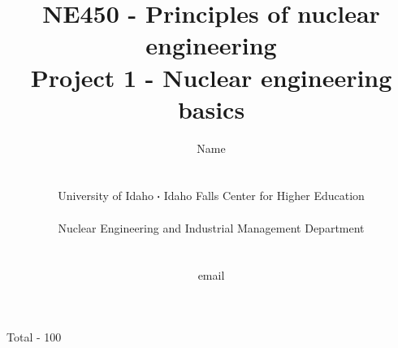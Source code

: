 \documentclass[11pt,a4paper]{article}
\newcommand*\sq{\mathbin{\vcenter{\hbox{\rule{.3ex}{.3ex}}}}} %
\begin{document}
\begin{titlepage}
    \title{
        NE450 - Principles of nuclear engineering\\
        Project 1 - Nuclear engineering basics\\
    }
    \author{
        Name
        \\ \\ \\
        University of Idaho $\sq$ Idaho Falls Center for Higher Education
        \\ \\
        Nuclear Engineering and Industrial Management Department
        \\ \\ \\
        email 
    }
\clearpage %
\maketitle
\vspace*{\fill}
\begin{flushright}{
        Total - 100
}
\end{flushright}
\thispagestyle{empty} %
\end{titlepage}
\end{document}
